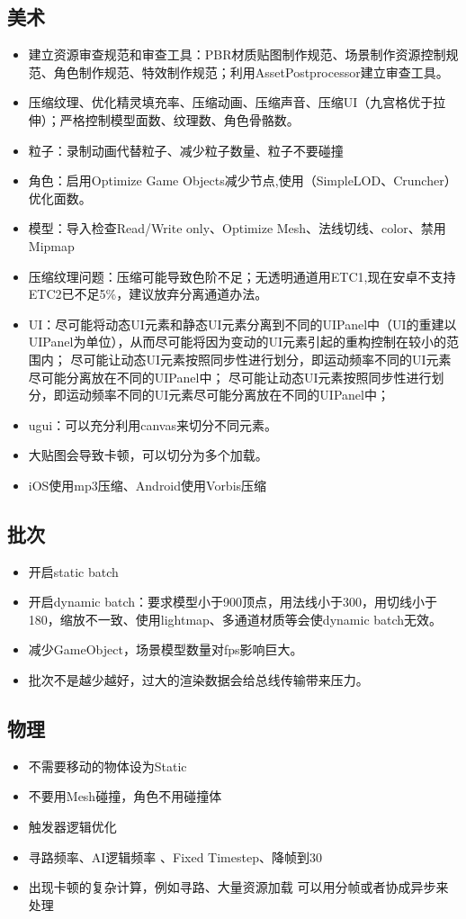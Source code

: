 \documentclass[9pt, b5paper]{article}
\begin{document}
\subsection{美术}
\label{sec-5-4}
\begin{itemize}
\item 建立资源审查规范和审查工具：PBR材质贴图制作规范、场景制作资源控制规范、角色制作规范、特效制作规范；利用AssetPostprocessor建立审查工具。
\item 压缩纹理、优化精灵填充率、压缩动画、压缩声音、压缩UI（九宫格优于拉伸）；严格控制模型面数、纹理数、角色骨骼数。
\item 粒子：录制动画代替粒子、减少粒子数量、粒子不要碰撞
\item 角色：启用Optimize Game Objects减少节点,使用（SimpleLOD、Cruncher）优化面数。
\item 模型：导入检查Read/Write only、Optimize Mesh、法线切线、color、禁用Mipmap
\item 压缩纹理问题：压缩可能导致色阶不足；无透明通道用ETC1,现在安卓不支持ETC2已不足5\%，建议放弃分离通道办法。
\item UI：尽可能将动态UI元素和静态UI元素分离到不同的UIPanel中（UI的重建以UIPanel为单位），从而尽可能将因为变动的UI元素引起的重构控制在较小的范围内； 尽可能让动态UI元素按照同步性进行划分，即运动频率不同的UI元素尽可能分离放在不同的UIPanel中； 尽可能让动态UI元素按照同步性进行划分，即运动频率不同的UI元素尽可能分离放在不同的UIPanel中；
\item ugui：可以充分利用canvas来切分不同元素。
\item 大贴图会导致卡顿，可以切分为多个加载。
\item iOS使用mp3压缩、Android使用Vorbis压缩
\end{itemize}
\subsection{批次}
\label{sec-5-5}
\begin{itemize}
\item 开启static batch
\item 开启dynamic batch：要求模型小于900顶点，用法线小于300，用切线小于180，缩放不一致、使用lightmap、多通道材质等会使dynamic batch无效。
\item 减少GameObject，场景模型数量对fps影响巨大。
\item 批次不是越少越好，过大的渲染数据会给总线传输带来压力。
\end{itemize}
\subsection{物理}
\label{sec-5-6}
\begin{itemize}
\item 不需要移动的物体设为Static
\item 不要用Mesh碰撞，角色不用碰撞体
\item 触发器逻辑优化
\item 寻路频率、AI逻辑频率 、Fixed Timestep、降帧到30
\item 出现卡顿的复杂计算，例如寻路、大量资源加载 可以用分帧或者协成异步来处理
\end{itemize}
\end{document}
